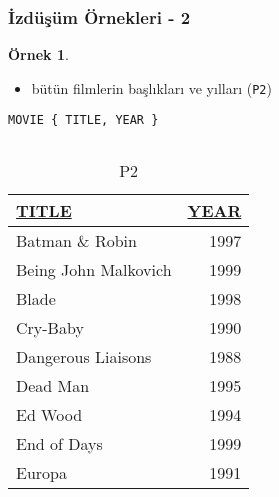 \documentclass[dvipsnames]{beamer}
\theoremstyle{definition}
\theoremstyle{example}
\newtheorem{ornek}[theorem]{Örnek}
\theoremstyle{plain}
\begin{document}
\begin{frame}[fragile]
  \frametitle{İzdüşüm Örnekleri - 2}

  \begin{ornek}
    \begin{itemize}
      \item bütün filmlerin başlıkları ve yılları (\texttt{P2})
    \end{itemize}

    \begin{lstlisting}
MOVIE { TITLE, YEAR }
    \end{lstlisting}

    \pause
    \vspace{-10pt}
    \begin{columns}[b]
      \begin{tiny}
      \begin{table}
        \caption{P2}
        \begin{tabular}{|l|r|}\hline
\underline{TITLE}              & \underline{YEAR}\\[2pt]\hline\hline
Batman \& Robin                & 1997\\\hline
Being John Malkovich           & 1999\\\hline
Blade                          & 1998\\\hline
Cry-Baby                       & 1990\\\hline
Dangerous Liaisons             & 1988\\\hline
Dead Man                       & 1995\\\hline
Ed Wood                        & 1994\\\hline
End of Days                    & 1999\\\hline
Europa                         & 1991\\\hline
        \end{tabular}
      \end{table}
      \end{tiny}


\end{columns}
\end{ornek}
\end{frame}
\end{document}
